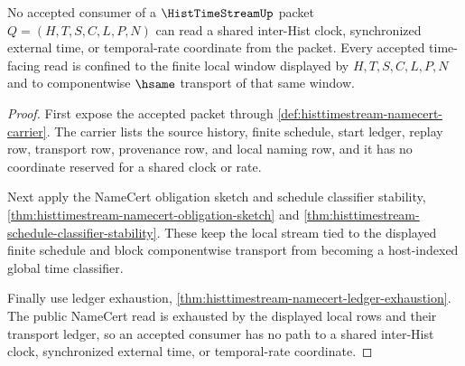 \begin{theorem}
\label{thm:hist-time-stream-clock-refusal}
No accepted consumer of a $\HistTimeStreamUp$ packet $Q=(H,T,S,C,L,P,N)$ can read a shared inter-Hist clock, synchronized external time, or temporal-rate coordinate from the packet. Every accepted time-facing read is confined to the finite local window displayed by $H,T,S,C,L,P,N$ and to componentwise $\hsame$ transport of that same window.
\end{theorem}
\begin{proof}
First expose the accepted packet through \autoref{def:histtimestream-namecert-carrier}. The carrier lists the source history, finite schedule, start ledger, replay row, transport row, provenance row, and local naming row, and it has no coordinate reserved for a shared clock or rate.

Next apply the NameCert obligation sketch and schedule classifier stability, \autoref{thm:histtimestream-namecert-obligation-sketch} and \autoref{thm:histtimestream-schedule-classifier-stability}. These keep the local stream tied to the displayed finite schedule and block componentwise transport from becoming a host-indexed global time classifier.

Finally use ledger exhaustion, \autoref{thm:histtimestream-namecert-ledger-exhaustion}. The public NameCert read is exhausted by the displayed local rows and their transport ledger, so an accepted consumer has no path to a shared inter-Hist clock, synchronized external time, or temporal-rate coordinate.
\end{proof}

